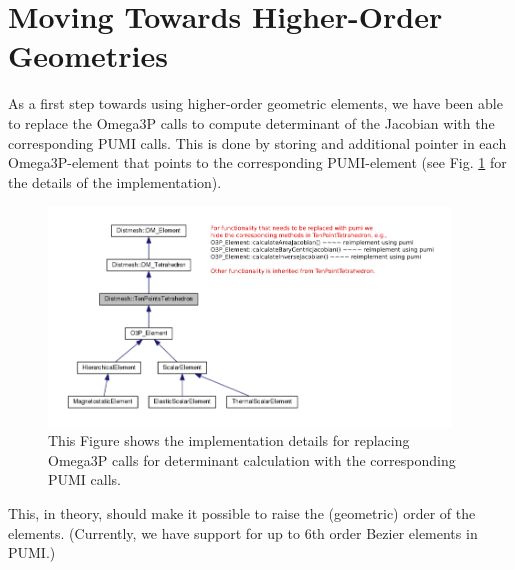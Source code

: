 \documentclass[review,authoryear,12pt]{elsarticle_summary_report}
\begin{document}
\section{Moving Towards Higher-Order Geometries}
As a first step towards using higher-order geometric elements, we have been able to replace the Omega3P calls to compute determinant of the Jacobian with the corresponding PUMI calls. This is done by storing and additional pointer in each Omega3P-element that points to the corresponding  PUMI-element (see Fig. \ref{imp} for the details of the implementation).
\begin{figure}[ph!]
\centering
\includegraphics[width=0.95\textwidth]{hide_ten_point_tet.png}
\caption{\label{imp} This Figure shows the implementation details for replacing Omega3P calls for determinant calculation with the corresponding PUMI calls.}
\end{figure}
This, in theory, should make it possible to raise the (geometric) order of the elements. (Currently, we have support for up to 6th order Bezier elements in PUMI.)

% 
% 

\newpage 

\end{document}
